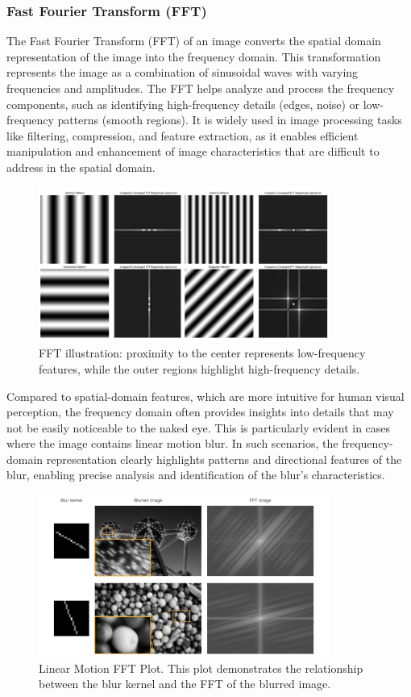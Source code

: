 \documentclass[twoside,11pt]{article}
\begin{document}
\subsubsection{Fast Fourier Transform (FFT)}
The Fast Fourier Transform (FFT) of an image converts the spatial domain representation of the image into the frequency domain. This transformation represents the image as a combination of sinusoidal waves with varying frequencies and amplitudes. The FFT helps analyze and process the frequency components, such as identifying high-frequency details (edges, noise) or low-frequency patterns (smooth regions). It is widely used in image processing tasks like filtering, compression, and feature extraction, as it enables efficient manipulation and enhancement of image characteristics that are difficult to address in the spatial domain.

\begin{figure}[H]
\centering
\includegraphics[width=0.85\textwidth]{figure3.png}
\caption{FFT illustration: proximity to the center represents low-frequency features, while the outer regions highlight high-frequency details.}
\end{figure}

Compared to spatial-domain features, which are more intuitive for human visual perception, the frequency domain often provides insights into details that may not be easily noticeable to the naked eye. This is particularly evident in cases where the image contains linear motion blur. In such scenarios, the frequency-domain representation clearly highlights patterns and directional features of the blur, enabling precise analysis and identification of the blur’s characteristics.

\begin{figure}[H]
\centering
\includegraphics[width=0.85\textwidth]{figure4.png}
\caption{Linear Motion FFT Plot. This plot demonstrates the relationship between the blur kernel and the FFT of the blurred image.}
\end{figure}
\end{document}
